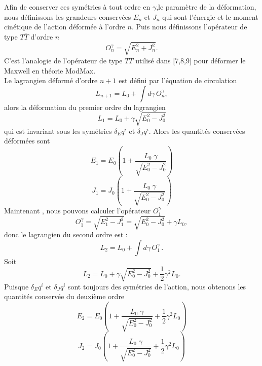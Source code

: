 \documentclass[12pt,a4paper, openany]{report}
\begin{document}
	\par Afin de conserver ces symétries à tout ordre en $\gamma$,le paramètre de la déformation, nous définissons les grandeurs conservées $E_n$ et $J_n$ qui sont l'énergie et le moment cinétique de l'action déformée à l'ordre $ n$. Puis nous définissons l'opérateur de type $T{\overline{T}}$ d'ordre $ n$ 
	\begin{equation}
		O^{\gamma}_{n}=\sqrt{E^{2}_n+J^{2}_n} .
	\end{equation} 
	C'est l'analogie de l'opérateur de type $T{\overline{T}}$ utilisé dans [7,8,9] pour déformer le Maxwell en théorie ModMax. \\ Le lagrangien déformé d'ordre $n+1$ est défini par l'équation de circulation
	\begin{equation}
		L_{n+1}=L_0+\int d{\gamma}\,O^{\gamma}_{n},
	\end{equation}
	alors la déformation du premier ordre du lagrangien 
	\begin{equation}
		L_1=L_0+\gamma\sqrt{E^{2}_0-J^{2}_0}
	\end{equation}
	qui est invariant sous les symétries $ \delta_{E}q^{i}$ et $\delta_{J}q^i$. Alors les quantités conservées déformées sont  
	\begin{equation}
		E_1=E_0(1+\frac{L_0\;\gamma}{\sqrt{E^{2}_0-J^{2}_0}})
	\end{equation}
	\begin{equation}
		J_1=J_0(1+\frac{L_0\;\gamma}{\sqrt{E^{2}_0-J^{2}_0}})
	\end{equation}
Maintenant , nous pouvons calculer l'opérateur $O_1^{\gamma}$
	\begin{equation}
		O_1^{\gamma}=\sqrt{E^{2}_1-J^{2}_1}=\sqrt{E^{2}_0-J^{2}_0}+{\gamma}L_0,
	\end{equation}
	donc le lagrangien du second ordre est :
	\begin{equation}
		L_2=L_0+\int  d{\gamma}\,O^{\gamma}_{1}\, . 	
	\end{equation}
	Soit 
	\begin{equation}
		L_2=L_0+\gamma{\sqrt{E^{2}_0-J^{2}_0}}+\frac{1}{2}{\gamma}^{2}L_0 .	
	\end{equation}
	Puisque  $ \delta_{E}q^{i}$ et $\delta_{J}q^i$ sont toujours des symétries de l'action, nous obtenons les quantités conservée du deuxième ordre 
	\begin{equation}
		E_2=E_0(1+\frac{L_0\;\gamma}{\sqrt{E^{2}_0-J^{2}_0}}+\frac{1}{2}{\gamma}^{2}L_0)	
	\end{equation}
	\begin{equation}
		J_2=J_0(1+\frac{L_0\;\gamma}{\sqrt{E^{2}_0-J^{2}_0}}+\frac{1}{2}{\gamma}^{2}L_0)	
	\end{equation}
\end{document}
